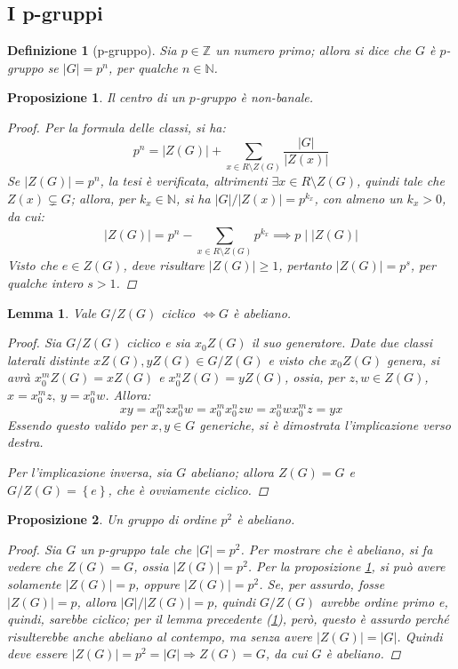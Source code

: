 \documentclass[11pt]{scrartcl}
\theoremstyle{style1}
\newtheorem{prop}{Proposizione}[section]
\newtheorem{lemma}{Lemma}[teorema]
\newtheorem{definizione}{Definizione}[section]
\numberwithin{equation}{subsection}
\begin{document}
\subsection{I p-gruppi}
\begin{definizione}
	[p-gruppo]
	Sia $p \in \mathbb{Z}$ un numero primo; allora si dice che $G$ \`e $p$-gruppo se $\lvert G \rvert = p^n$, per qualche $n \in \mathbb{N}$.
\end{definizione}
\begin{prop}\label{pnb}
	Il centro di un $p$-gruppo \`e non-banale.
	\begin{proof}
		Per la formula delle classi, si ha:
		\[
		p^n = \lvert Z(G) \rvert  + \sum_{x \in R \setminus Z(G)}^{} \frac{\lvert G \rvert }{\lvert Z(x) \rvert }
		\] 
		Se $\lvert Z(G) \rvert  = p^n$, la tesi \`e verificata, altrimenti $\exists x \in R \setminus Z(G)$, quindi tale che $Z(x) \subsetneq G$; allora, per $k_x\in \mathbb{N}$, si ha $\lvert G \rvert / \lvert Z(x) \rvert = p^{k_x} $, con almeno un $k_x > 0$, da cui:
		\[
		\lvert Z(G) \rvert =p^n - \sum_{x \in R \setminus Z(G)}^{} p^{k_x} \implies p  \mid \lvert Z(G) \rvert 
		\] 
		Visto che $e \in Z(G)$, deve risultare $\lvert Z(G) \rvert \ge 1$, pertanto $\lvert Z(G) \rvert = p^s$, per qualche intero $s > 1$.
	\end{proof}
\end{prop} 
\begin{lemma}\label{GZGciffban}
	Vale $G / Z(G)$ ciclico $\iff G$ \`e abeliano.
	\begin{proof}
		Sia $G / Z(G)$ ciclico e sia $x_0 Z(G)$ il suo generatore.
		Date due classi laterali distinte $xZ(G), yZ(G) \in G / Z(G)$ e visto che $x_0Z(G)$ genera, si avr\`a $x_0^m Z(G)= x Z(G)$ e $x_0^nZ(G) = yZ(G)$, ossia, per $z,w \in Z(G)$, $x = x_0^m z,\ y = x_0^n w$. 
		Allora:
		\[
			 xy = x_0^m z x_0^n w = x_0^m x_0^n zw = x_0^n wx_0^m z = yx
		\] 
	Essendo questo valido per $x,y \in G$ generiche, si \`e dimostrata l'implicazione verso destra.

	Per l'implicazione inversa, sia $G$ abeliano; allora $Z(G) = G$ e $G / Z(G) = \left\{ e \right\} $, che \`e ovviamente ciclico.
	\end{proof}
\end{lemma}
\begin{prop}
	Un gruppo di ordine $p^2$ \`e abeliano.
	\begin{proof}
		Sia $G$ un $p$-gruppo tale che $\lvert G \rvert  = p^2$. Per mostrare che \`e abeliano, si fa vedere che $Z(G) = G$, ossia $\lvert Z(G) \rvert  = p^2$.
		Per la proposizione \ref{pnb}, si pu\`o avere solamente $\lvert Z(G) \rvert = p$, oppure $\lvert Z(G) \rvert = p ^2$.
		Se, per assurdo, fosse $\lvert Z(G) \rvert =p$, allora $\lvert G \rvert / \lvert Z(G) \rvert = p$, quindi $G / Z(G)$ avrebbe ordine primo e, quindi, sarebbe ciclico; per il lemma precedente (\ref{GZGciffban}), per\`o, questo \`e assurdo perch\'e risulterebbe anche abeliano al contempo, ma senza avere $\lvert Z(G) \rvert  = \lvert G \rvert $.
		Quindi deve essere $\lvert Z(G) \rvert  = p^2 = \lvert G \rvert \Rightarrow Z(G) = G$, da cui $G$ \`e abeliano.
	\end{proof}
\end{prop}
\end{document}
